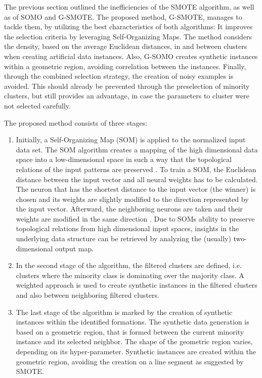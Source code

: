 \documentclass[parskip=full]{scrartcl}
\begin{document}
The previous section outlined the inefficiencies of the SMOTE algorithm, as well
as of SOMO and G-SMOTE. The proposed method, G-SMOTE, manages to tackle them, by
utilizing the best characteristics of both algorithms: It improves the selection
criteria by leveraging Self-Organizing Maps. The method considers the density,
based on the average Euclidean distances, in and between clusters when creating
artificial data instances. Also, G-SOMO creates synthetic instances within a
geometric region, avoiding correlation between the instances. Finally, through
the combined selection strategy, the creation of noisy examples is avoided. This
should already be prevented through the preselection of minority clusters, but
still provides an advantage, in case the parameters to cluster were not selected
carefully.

The proposed method consists of three stages:

\begin{enumerate}

	\item Initially, a Self-Organizing Map (SOM) is applied to the normalized
		  input data set. The SOM algorithm creates a mapping of the high
		  dimensional data space into a low-dimensional space in such a way that
		  the topological relations of the input patterns are preserved
		  \cite{KOKUER2007}. To train a SOM, the Euclidean distance between the
		  input vector and all neural weights has to be calculated. The neuron
		  that has the shortest distance to the input vector (the winner) is
		  chosen and its weights are slightly modified to the direction
		  represented by the input vector. Afterward, the neighboring neurons
		  are taken and their weights are modified in the same direction
		  \cite{Brocki2007}. Due to SOMs ability to preserve topological
		  relations from high dimensional input spaces, insights in the
		  underlying data structure can be retrieved by analyzing the (usually)
		  two-dimensional output map. 
	
	\item In the second stage of the algorithm, the filtered clusters are
		  defined, i.e. clusters where the minority class is dominating over the
		  majority class. A weighted approach is used to create synthetic
		  instances in the filtered clusters and also between neighboring
		  filtered clusters. 
		  
	\item The last stage of the algorithm is marked by the creation of synthetic
		  instances within the identified formations. The synthetic data
		  generation is based on a geometric region, that is formed between the
		  current minority instance and its selected neighbor. The shape of the
		  geometric region varies, depending on its hyper-parameter. Synthetic
		  instances are created within the geometric region, avoiding the
		  creation on a line segment as suggested by SMOTE.

\end{enumerate}
\end{document}
